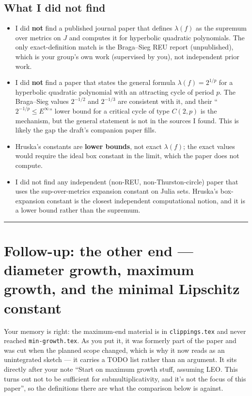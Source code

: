\documentclass[
]{article}
\providecommand{\tightlist}{%
  \setlength{\itemsep}{0pt}\setlength{\parskip}{0pt}}
\begin{document}
\subsection{What I did not find}\label{what-i-did-not-find-1}

\begin{itemize}
\tightlist
\item
  I did \textbf{not} find a published journal paper that defines
  \(\lambda(f)\) as the supremum over metrics on \(J\) and computes it
  for hyperbolic quadratic polynomials. The only exact-definition match
  is the Braga--Sieg REU report (unpublished), which is your group's own
  work (supervised by you), not independent prior work.
\item
  I did \textbf{not} find a paper that states the general formula
  \(\lambda(f)=2^{1/p}\) for a hyperbolic quadratic polynomial with an
  attracting cycle of period \(p\). The Braga--Sieg values \(2^{-1/2}\)
  and \(2^{-1/3}\) are consistent with it, and their
  ``\(2^{-1/p}\le E^\infty\)'' lower bound for a critical cycle of type
  \(C(2,p)\) is the mechanism, but the general statement is not in the
  sources I found. This is likely the gap the draft's companion paper
  fills.
\item
  Hruska's constants are \textbf{lower bounds}, not exact
  \(\lambda(f)\); the exact values would require the ideal box constant
  in the limit, which the paper does not compute.
\item
  I did not find any independent (non-REU, non-Thurston-circle) paper
  that uses the sup-over-metrics expansion constant on Julia sets.
  Hruska's box-expansion constant is the closest independent
  computational notion, and it is a lower bound rather than the
  supremum.
\end{itemize}

\begin{center}\rule{0.5\linewidth}{0.5pt}\end{center}

\section{Follow-up: the other end --- diameter growth, maximum growth,
and the minimal Lipschitz
constant}\label{follow-up-the-other-end-diameter-growth-maximum-growth-and-the-minimal-lipschitz-constant}

Your memory is right: the maximum-end material is in
\texttt{clippings.tex} and never reached \texttt{min-growth.tex}. As you
put it, it was formerly part of the paper and was cut when the planned
scope changed, which is why it now reads as an unintegrated sketch ---
it carries a TODO list rather than an argument. It sits directly after
your note ``Start on maximum growth stuff, assuming LEO. This turns out
not to be sufficient for submultiplicativity, and it's not the focus of
this paper'', so the definitions there are what the comparison below is
against.
\end{document}
